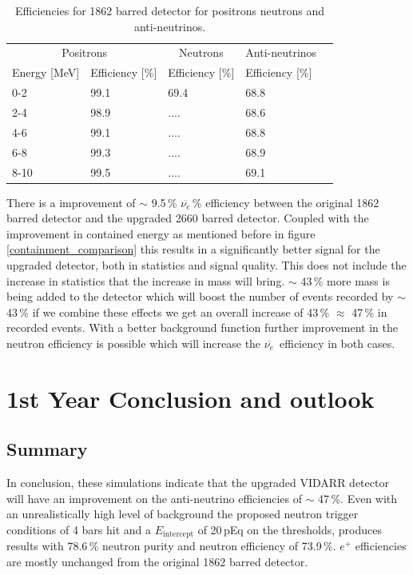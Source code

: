 \documentclass[12pt,a4paper]{article}
\begin{document}
\begin{table}[h]
\centering
\begin{tabular}{lllll}  
\toprule
\multicolumn{2}{c}{Positrons} & \multicolumn{1}{c}{Neutrons} & \multicolumn{1}{c}{Anti-neutrinos}
\\
\cmidrule(r){1-2}
\cmidrule(r){3-3}
\cmidrule(r){4-4}
Energy [MeV] & Efficiency [\%] & Efficiency [\%]  & Efficiency [\%]\\
\midrule
0-2          & 99.1            & 69.4             & 68.8\\
2-4          & 98.9            & ....             & 68.6\\
4-6          & 99.1            & ....             & 68.8\\
6-8          & 99.3            & ....             & 68.9\\
8-10         & 99.5            & ....             & 69.1\\
\bottomrule  
\end{tabular}
\caption{Efficiencies for 1862 barred detector for positrons neutrons and anti-neutrinos. }
\label{tab_2000_an_eff}
\end{table}

There is a improvement of $\sim$ 9.5\,\% $\overline{\nu_e}$\,\% efficiency between the original 1862 barred detector and the upgraded 2660 barred detector. Coupled with the improvement in contained energy as mentioned before in figure \ref{containment_comparison} this results in a significantly better signal for the upgraded detector, both in statistics and signal quality. This does not include the increase in statistics that the increase in mass will bring. $\sim$ 43\,\% more mass is being added to the detector which will boost the number of events recorded by $\sim$ 43\,\% if we combine these effects we get an overall increase of 43\,\%  $\approx$ 47\,\% in recorded events. With a better background function further improvement in the neutron efficiency is possible which will increase the $\overline{\nu_e}$\, efficiency in both cases.


\section{1st Year Conclusion and outlook}
\subsection{Summary}
In conclusion, these simulations indicate that the upgraded VIDARR detector will have an improvement on the anti-neutrino efficiencies of $\sim$ 47\,\%. Even with an unrealistically high level of background the proposed neutron trigger conditions of 4 bars hit and a $E_\textrm{intercept}$ of 20\,pEq on the thresholds, produces results with 78.6\,\% neutron purity and neutron efficiency of 73.9\,\%. $e^+$ efficiencies are mostly unchanged from the original 1862 barred detector. \\
\end{document}
